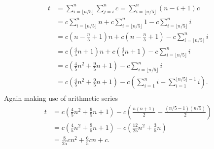 \documentclass[10pt,oneside,reqno]{amsart}
\theoremstyle{plain}
\theoremstyle{definition}
\begin{document}
\begin{enumerate}[label=]
\begin{enumerate}
\begin{equation}
\begin{aligned}
t &= \sum_{i = \lfloor n/5 \rfloor}^{n}\sum_{j = i}^{n}c = \sum_{i = \lfloor n/5 \rfloor}^{n}(n - i + 1)c \\
&= c \sum_{i = \lfloor n/5 \rfloor}^{n}n + c\sum_{i = \lfloor n/5 \rfloor}^{n}1 - c\sum_{i = \lfloor n/5 \rfloor}^{n}i\\
&= c(n - \frac{n}{5} + 1)n + c(n - \frac{n}{5} + 1)- c\sum_{i = \lfloor n/5 \rfloor}^{n}i \\
&= c(\frac{4}{5}n + 1)n + c(\frac{4}{5}n  +1)  -c \sum_{i = \lfloor n/5 \rfloor}^{n}i\\
&= c \left( \frac{4}{5}n^2 + \frac{9}{5}n + 1\right) -c \sum_{i = \lfloor n/5 \rfloor}^{n}i \\
&= c \left( \frac{4}{5}n^2 + \frac{9}{5}n + 1\right) - c\left(\sum_{i = 1}^ni - \sum_{i = 1}^{\lfloor n/5 \rfloor - 1}i \right).\\
\end{aligned}
\end{equation}
Again making use of arithmetic series
\begin{equation}
\begin{aligned}
t&= c \left( \frac{4}{5}n^2 + \frac{9}{5}n + 1\right) - c\left(\frac{n(n + 1)}{2} - \frac{(n/5 - 1)(n/5)}{2} \right)\\
&= c \left( \frac{4}{5}n^2 + \frac{9}{5}n + 1\right) - c\left(\frac{12}{25}n^2 + \frac{3}{5}n \right)\\
&=  \boxed{\frac{8}{25}cn^2} + \frac{6}{5}cn + c. 
\end{aligned}
\end{equation}




\end{enumerate}




\end{enumerate}
\end{document}

